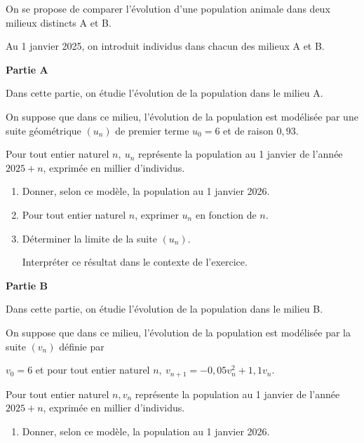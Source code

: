 On se propose de comparer l'évolution d'une population animale dans deux milieux distincts A et B.

Au 1 janvier 2025, on introduit  individus dans chacun des milieux A et B.

\medskip

\textbf{Partie A}

\medskip

Dans cette partie, on étudie l'évolution de la population dans le milieu A.

On suppose que dans ce milieu, l'évolution de la population est modélisée par une suite géométrique $(u_n)$ de premier terme $u_0 = 6$ et de raison $0,93$.

Pour tout entier naturel $n,\: u_n$ représente la population au 1 janvier de l'année $2025+n$, exprimée en millier d'individus.

\medskip

\begin{enumerate}
\item Donner, selon ce modèle, la population au 1 janvier 2026.
\item Pour tout entier naturel $n$, exprimer $u_n$ en fonction de $n$.
\item Déterminer la limite de la suite $(u_n)$.

Interpréter ce résultat dans le contexte de l'exercice.
\end{enumerate}

\medskip

\textbf{Partie B}

\medskip

Dans cette partie, on étudie l'évolution de la population dans le milieu B.

On suppose que dans ce milieu, l'évolution de la population est modélisée par la suite $(v_n)$ définie par 

\begin{center}$v_0 = 6$ et pour tout entier naturel $n,\: v_{n+1} = -0,05v_n^2 +1,1v_n$.\end{center}

Pour tout entier naturel $n, v_n$ représente la population au 1 janvier de l'année $2025 + n$, exprimée en millier d'individus.

\medskip

\begin{enumerate}
\item Donner, selon ce modèle, la population au 1 janvier 2026.
\end{enumerate}

